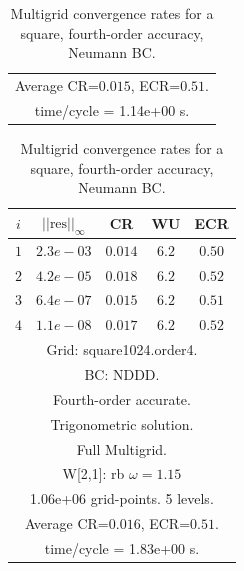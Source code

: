 \begin{table}[hbt]
\begin{center}
{\begin{tabular}{|c|c|c|c|c|}
\multicolumn{5}{|c|}{Average CR=$0.015$, ECR=$0.51$.}  \\
\multicolumn{5}{|c|}{time/cycle = 1.14e+00 s.}  \\
\hline 
\end{tabular}
\begin{tabular}{|c|c|c|c|c|} \hline 
 $i$   & $\vert\vert\mbox{res}\vert\vert_\infty$  &  CR     &  WU    & ECR  \\   \hline 
 $ 1$  & $ 2.3e-03$ & $0.014$ & $ 6.2$ & $0.50$ \\ 
 $ 2$  & $ 4.2e-05$ & $0.018$ & $ 6.2$ & $0.52$ \\ 
 $ 3$  & $ 6.4e-07$ & $0.015$ & $ 6.2$ & $0.51$ \\ 
 $ 4$  & $ 1.1e-08$ & $0.017$ & $ 6.2$ & $0.52$ \\ 
\hline 
\multicolumn{5}{|c|}{Grid: square1024.order4.}  \\
\multicolumn{5}{|c|}{BC: NDDD.}  \\
\multicolumn{5}{|c|}{Fourth-order accurate.}  \\
\multicolumn{5}{|c|}{Trigonometric solution.}  \\
\multicolumn{5}{|c|}{Full Multigrid.}  \\
\multicolumn{5}{|c|}{W[2,1]: rb $\omega=1.15$}  \\
\multicolumn{5}{|c|}{1.06e+06 grid-points. 5 levels.}  \\
\multicolumn{5}{|c|}{Average CR=$0.016$, ECR=$0.51$.}  \\
\multicolumn{5}{|c|}{time/cycle = 1.83e+00 s.}  \\
\hline 
\end{tabular}
} %
\end{center}
\caption{Multigrid convergence rates for a square, fourth-order accuracy, Neumann BC.}
 \label{tab:square4} 
\end{table}









